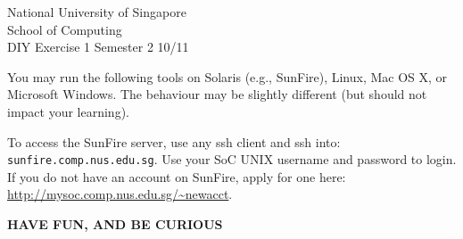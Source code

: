 \documentclass[a4paper,11pt]{exam}
\begin{document}
\extraheadheight{.5in}
%
{\large\sf National University of Singapore\\ School of Computing \\
\LARGE\sf DIY Exercise 1}%
{\large\sf Semester 2 10/11}
\firstpageheadrule
\pagestyle{headandfoot}

You may run the following tools on Solaris (e.g., SunFire), Linux, Mac OS X, or Microsoft Windows.  The behaviour may be slightly different (but should not impact your learning).

To access the SunFire server, use any ssh client and ssh into:
\texttt{sunfire.comp.nus.edu.sg}.   Use your SoC UNIX username and password to login.  If you do not have an account on SunFire, apply for one here: \url{http://mysoc.comp.nus.edu.sg/~newacct}.

\begin{center}
	\textbf\textsf{HAVE FUN, AND BE CURIOUS}
\end{center}
\end{document}
